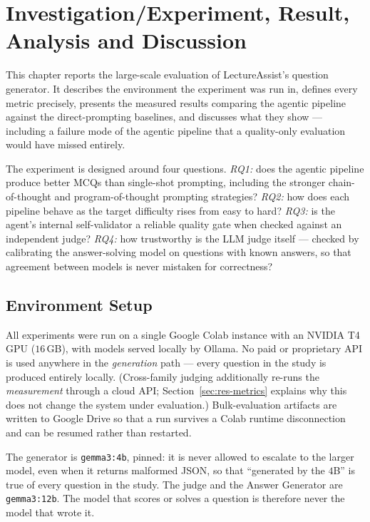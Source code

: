 \chapter{Investigation/Experiment, Result, Analysis and Discussion}
\label{ch:results}

This chapter reports the large-scale evaluation of LectureAssist's question
generator. It describes the environment the experiment was run in, defines every
metric precisely, presents the measured results comparing the agentic pipeline
against the direct-prompting baselines, and discusses what they show --- including a
failure mode of the agentic pipeline that a quality-only evaluation would have
missed entirely.

The experiment is designed around four questions.
\emph{RQ1:} does the agentic pipeline produce better MCQs than single-shot
prompting, including the stronger chain-of-thought and program-of-thought
prompting strategies?
\emph{RQ2:} how does each pipeline behave as the target difficulty rises from
easy to hard?
\emph{RQ3:} is the agent's internal self-validator a reliable quality gate when
checked against an independent judge?
\emph{RQ4:} how trustworthy is the LLM judge itself --- checked by calibrating
the answer-solving model on questions with known answers, so that agreement
between models is never mistaken for correctness?

\section{Environment Setup}
\label{sec:res-env}

All experiments were run on a single Google Colab instance with an NVIDIA T4 GPU
($16$\,GB), with models served locally by Ollama. No paid or proprietary API is used
anywhere in the \emph{generation} path --- every question in the study is produced
entirely locally. (Cross-family judging additionally re-runs the \emph{measurement}
through a cloud API; Section~\ref{sec:res-metrics} explains why this does not change
the system under evaluation.) Bulk-evaluation artifacts are written to Google Drive
so that a run survives a Colab runtime disconnection and can be resumed rather than
restarted.

The generator is \texttt{gemma3:4b}, pinned: it is never allowed to escalate to the
larger model, even when it returns malformed JSON, so that ``generated by the $4$B''
is true of every question in the study. The judge and the Answer Generator are
\texttt{gemma3:12b}. The model that scores or solves a question is therefore never
the model that wrote it.


